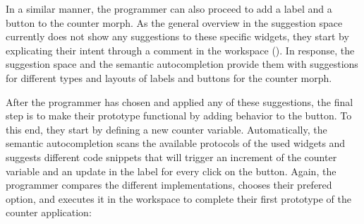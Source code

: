 In a similar manner, the programmer can also proceed to add a label and a button to the counter morph.
As the general overview in the suggestion space currently does not show any suggestions to these specific widgets, they start by explicating their intent through a comment in the workspace ().
In response, the suggestion space and the semantic autocompletion provide them with suggestions for different types and layouts of labels and buttons for the counter morph.

After the programmer has chosen and applied any of these suggestions, the final step is to make their prototype functional by adding behavior to the button.
To this end, they start by defining a new counter variable.
Automatically, the semantic autocompletion scans the available protocols of the used widgets and suggests different code snippets that will trigger an increment of the counter variable and an update in the label for every click on the button.
Again, the programmer compares the different implementations, chooses their prefered option, and executes it in the workspace to complete their first prototype of the counter application:

